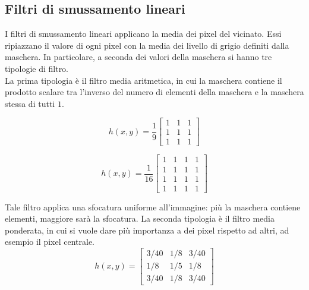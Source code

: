 \subsection{Filtri di smussamento lineari}
I filtri di smussamento lineari applicano la media dei pixel del vicinato. Essi ripiazzano il valore di ogni pixel con la media dei livello di grigio definiti dalla maschera. In particolare, a seconda dei valori della maschera si hanno tre tipologie di filtro.\\
La prima tipologia è il filtro media aritmetica, in cui la maschera contiene il prodotto scalare tra l'inverso del numero di elementi della maschera e la maschera stessa di tutti $1$.
\begin{center}
\begin{minipage}{0.48\textwidth} %
    \centering
    \begin{equation*}
        h(x,y) = \frac{1}{9}\begin{bmatrix}
            1 & 1 & 1 \\
            1 & 1 & 1 \\
            1 & 1 & 1
        \end{bmatrix}
    \end{equation*}
\end{minipage}
\hfill %
\begin{minipage}{0.48\textwidth} %
    \centering
    \begin{equation*}
         h(x,y) = \frac{1}{16}\begin{bmatrix}
            1 & 1 & 1 & 1\\
            1 & 1 & 1 & 1\\
            1 & 1 & 1 & 1\\
            1 & 1 & 1 & 1
        \end{bmatrix}
    \end{equation*}
\end{minipage}
\end{center}
Tale filtro applica una sfocatura uniforme all'immagine: più la maschera contiene elementi, maggiore sarà la sfocatura.
La seconda tipologia è il filtro media ponderata, in cui si vuole dare più importanza a dei pixel rispetto ad altri, ad esempio il pixel centrale.
\begin{equation*}
        h(x,y) = \begin{bmatrix}
            3/40 & 1/8 & 3/40 \\
            1/8 & 1/5 & 1/8 \\
            3/40 & 1/8 & 3/40
        \end{bmatrix}
\end{equation*}
